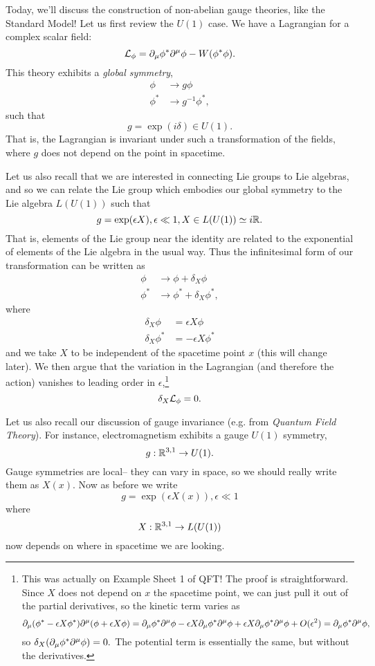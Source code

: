 Today, we'll discuss the construction of non-abelian gauge theories, like the Standard Model! Let us first review the $U(1)$ case. We have a Lagrangian for a complex scalar field:
$$\mathcal L_\phi = \partial_\mu \phi^* \partial^\mu \phi- W(\phi^* \phi).$$
This theory exhibits a \emph{global symmetry},
\begin{align*}
    \phi&\to g \phi\\
    \phi^* &\to g^{-1}\phi^*,
\end{align*}
such that
$$g=\exp(i\delta) \in U(1).$$
That is, the Lagrangian is invariant under such a transformation of the fields, where $g$ does not depend on the point in spacetime.

Let us also recall that we are interested in connecting Lie groups to Lie algebras, and so we can relate the Lie group which embodies our global symmetry to the Lie algebra $L(U(1))$ such that
$$g=\exp(\epsilon X), \epsilon \ll 1, X \in L(U(1)) \simeq i\mathbb{R}.$$
That is, elements of the Lie group near the identity are related to the exponential of elements of the Lie algebra in the usual way.
Thus the infinitesimal form of our transformation can be written as
\begin{align*}
    \phi&\to \phi+\delta_X \phi\\
    \phi^* &\to \phi^*+\delta_X \phi^*,
\end{align*}
where
\begin{align*}
    \delta_X \phi &= \epsilon X \phi\\
    \delta_X \phi^* &= -\epsilon X \phi^*
\end{align*}
and we take $X$ to be independent of the spacetime point $x$ (this will change later).
We then argue that the variation in the Lagrangian (and therefore the action) vanishes to leading order in $\epsilon$,\footnote{This was actually on Example Sheet 1 of QFT! The proof is straightforward. Since $X$ does not depend on $x$ the spacetime point, we can just pull it out of the partial derivatives, so the kinetic term varies as
$$\partial_\mu(\phi^*-\epsilon X \phi^*) \partial^\mu (\phi+\epsilon X \phi)=\partial_\mu \phi^* \partial^\mu \phi -\epsilon X \partial_\mu \phi^* \partial^\mu \phi +\epsilon X \partial_\mu \phi^* \partial^\mu \phi +O(\epsilon^2)= \partial_\mu \phi^* \partial^\mu \phi,$$
so $\delta_X (\partial_\mu \phi^* \partial^\mu \phi)=0.$
The potential term is essentially the same, but without the derivatives.}
$$\delta_X \mathcal L_\phi =0.$$

Let us also recall our discussion of gauge invariance (e.g. from \emph{Quantum Field Theory}). For instance, electromagnetism exhibits a gauge $U(1)$ symmetry,
$$g:\mathbb{R}^{3,1}\to U(1).$$
Gauge symmetries are local-- they can vary in space, so we should really write them as $X(x)$. Now as before we write
$$g=\exp(\epsilon X(x)), \epsilon \ll 1$$
where
$$X:\mathbb{R}^{3,1}\to L(U(1))$$
now depends on where in spacetime we are looking.

